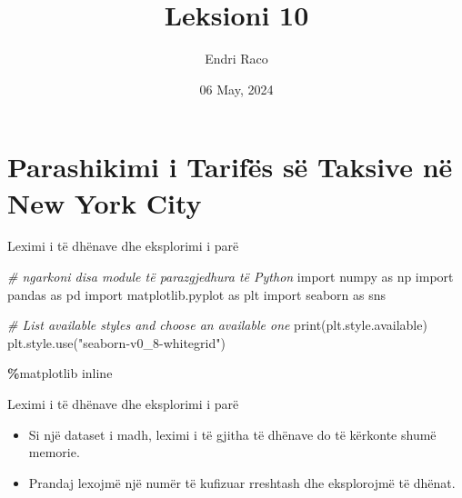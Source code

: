 \documentclass[
  ignorenonframetext,
]{beamer}
\title{Leksioni 10}
\author{Endri Raco}
\date{06 May, 2024}
\newenvironment{Shaded}{\begin{snugshade}}{\end{snugshade}}
\newcommand{\BuiltInTok}[1]{#1}
\newcommand{\CommentTok}[1]{\textcolor[rgb]{0.56,0.35,0.01}{\textit{#1}}}
\newcommand{\ImportTok}[1]{#1}
\newcommand{\NormalTok}[1]{#1}
\newcommand{\OperatorTok}[1]{\textcolor[rgb]{0.81,0.36,0.00}{\textbf{#1}}}
\newcommand{\StringTok}[1]{\textcolor[rgb]{0.31,0.60,0.02}{#1}}
\begin{document}
\frame{\titlepage}

\begin{frame}[allowframebreaks]
  \tableofcontents[hideallsubsections]
\end{frame}
\hypertarget{parashikimi-i-tarifuxebs-suxeb-taksive-nuxeb-new-york-city}{%
\section{Parashikimi i Tarifës së Taksive në New York
City}\label{parashikimi-i-tarifuxebs-suxeb-taksive-nuxeb-new-york-city}}

\begin{frame}[fragile]{Leximi i të dhënave dhe eksplorimi i parë}
\protect\hypertarget{leximi-i-tuxeb-dhuxebnave-dhe-eksplorimi-i-paruxeb}{}

\begin{Shaded}
\begin{Highlighting}[]
\CommentTok{\# ngarkoni disa module të parazgjedhura të Python}
\ImportTok{import}\NormalTok{ numpy }\ImportTok{as}\NormalTok{ np}
\ImportTok{import}\NormalTok{ pandas }\ImportTok{as}\NormalTok{ pd}
\ImportTok{import}\NormalTok{ matplotlib.pyplot }\ImportTok{as}\NormalTok{ plt}
\ImportTok{import}\NormalTok{ seaborn }\ImportTok{as}\NormalTok{ sns}

\CommentTok{\# List available styles and choose an available one}
\BuiltInTok{print}\NormalTok{(plt.style.available)}
\NormalTok{plt.style.use(}\StringTok{"seaborn{-}v0\_8{-}whitegrid"}\NormalTok{)}

\OperatorTok{\%}\NormalTok{matplotlib inline}
\end{Highlighting}
\end{Shaded}
\end{frame}

\begin{frame}{Leximi i të dhënave dhe eksplorimi i parë}
\protect\hypertarget{leximi-i-tuxeb-dhuxebnave-dhe-eksplorimi-i-paruxeb-1}{}
\begin{itemize}
\item
  Si një dataset i madh, leximi i të gjitha të dhënave do të kërkonte
  shumë memorie.
\item
  Prandaj lexojmë një numër të kufizuar rreshtash dhe eksplorojmë të
  dhënat.
\end{itemize}
\end{frame}
\end{document}
